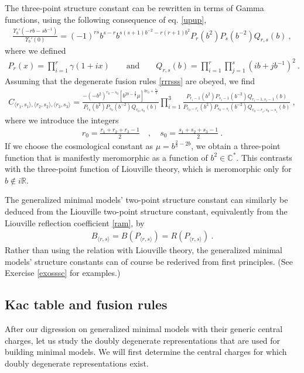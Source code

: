 \documentclass[12pt, a4paper, notitlepage, twoside]{report}
\numberwithin{equation}{section}
\theoremstyle{break}
\begin{document}
The three-point structure constant can be rewritten in terms of Gamma functions, using the following consequence of eq. \eqref{upup},
\begin{align}
 \frac{\Upsilon_b'(-rb-sb^{-1})}{\Upsilon_b'(0)} = (-1)^{rs} b^{s-r} b^{s(s+1)b^{-2}-r(r+1)b^2} P_r(b^2)P_s(b^{-2}) Q_{r,s}(b)\ ,
\end{align}
where we defined
\begin{align}
 P_r(x) = \prod_{i=1}^r \gamma(1+ix) \qquad \text{and} \qquad Q_{r,s}(b) = \prod_{i=1}^r \prod_{j=1}^s (ib+jb^{-1})^2\ .
\end{align}
Assuming that the degenerate fusion rules \eqref{rrrsss} are obeyed, we find 
\begin{align}
 C_{\langle r_1,s_1\rangle ,\langle r_2,s_2\rangle ,\langle r_3,s_3 \rangle} =  \frac{-(-b^2)^{r_0-s_0}\left[b^{2b-\frac{2}{b}}\mu\right]^{br_0 + \frac{s_0}{b}}}{P_{r_0}(b^2)P_{s_0}(b^{-2})Q_{r_0,s_0}(b)} \prod_{i=1}^3 \frac{P_{r_i-1}(b^2)P_{s_i-1}(b^{-2}) Q_{r_i-1,s_i-1}(b)}{P_{r_0-r_i}(b^2)P_{s_0-s_i}(b^{-2}) Q_{r_0-r_i,s_0-s_i}(b)} \ ,
\label{cpqb}
\end{align}
where we introduce the integers
\begin{align}
 r_0 = \frac{r_1+r_2+r_3-1}{2} \quad , \quad s_0=\frac{s_1+s_2+s_3-1}{2}\ .
\end{align}
If we choose the cosmological constant as $\mu = b^{\frac{2}{b}-2b}$, we obtain a three-point function that is manifestly meromorphic as a function of $b^2\in {\mathbb{C}}^*$.
This contrasts with the three-point function of Liouville theory, which is
meromorphic only for $b\notin i\mathbb{R}$. 

The generalized minimal models' two-point structure constant can similarly be deduced from the Liouville two-point structure constant, equivalently from the Liouville reflection coefficient \eqref{ram}, by 
\begin{align}
B_{\langle r,s\rangle} = B(P_{\langle r,s\rangle}) = R(P_{\langle r,s\rangle})\ .
\end{align}
Rather than using the relation with Liouville theory, the generalized minimal models' structure constants can of course be rederived from first principles. (See Exercise \ref{exosssc} for examples.)

\subsection{Kac table and fusion rules \label{secmmf}}

After our digression on generalized minimal models with their generic central charges, let us study the doubly degenerate representations that are used for building minimal models. We will first determine the central charges for which doubly degenerate representations exist. 
\end{document}
